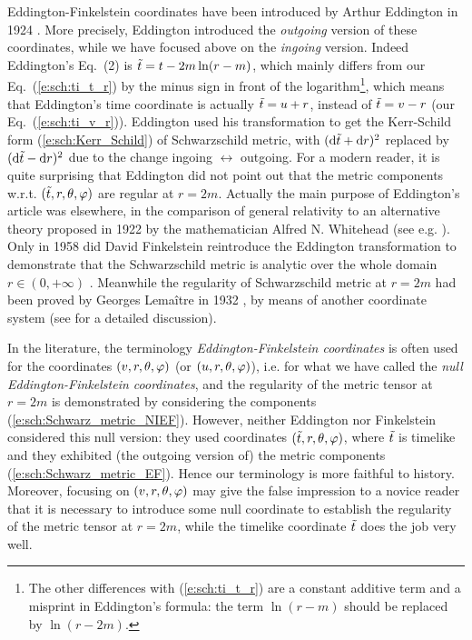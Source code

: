 \begin{hist}
Eddington-Finkelstein coordinates have been introduced by
Arthur Eddington in 1924 \cite{Eddin1924}. More precisely, Eddington
introduced the \emph{outgoing} version of these coordinates,
while we have focused above on the \emph{ingoing} version. Indeed
Eddington's Eq.~(2) is ${\tilde t} = t - 2m \ln(r-m)$, which mainly differs from
our Eq.~(\ref{e:sch:ti_t_r}) by the minus sign in front of the logarithm\footnote{The other differences with (\ref{e:sch:ti_t_r}) are a constant additive term
and a misprint in Eddington's formula: the term $\ln(r-m)$ should be replaced
by $\ln(r-2m)$.},
which means that Eddington's time coordinate is actually ${\tilde t} = u + r$, instead of
${\tilde t} = v - r$ (our Eq.~(\ref{e:sch:ti_v_r})). Eddington used his transformation
to get the Kerr-Schild form (\ref{e:sch:Kerr_Schild}) of Schwarzschild metric,
with $(\mathrm{d} {\tilde t} + \mathrm{d} r)^2$ replaced by $(\mathrm{d} {\tilde t} - \mathrm{d} r)^2$ due to the change
ingoing $\leftrightarrow$ outgoing. For a modern reader, it is quite surprising
that Eddington did not point out that the metric components w.r.t. $({\tilde t},r,\theta,\varphi)$
are regular at $r=2m$. Actually the main purpose of Eddington's article
\cite{Eddin1924} was elsewhere, in the comparison of general relativity to an alternative theory proposed in 1922 by the mathematician Alfred N. Whitehead
(see e.g. \cite{GibboW08}).
Only in 1958 did David Finkelstein reintroduce the Eddington transformation
to demonstrate that the Schwarzschild metric is analytic over the whole domain
$r\in(0,+\infty)$ \cite{Finke58}. Meanwhile the regularity of Schwarzschild metric
at $r=2m$ had been proved by Georges Lemaître in 1932 \cite{Lemai32}, by means of
another coordinate system (see \cite{Eisen93} for a detailed discussion).
\end{hist}

\begin{remark}
In the literature, the terminology \emph{Eddington-Finkelstein coordinates}
is often used for the coordinates $(v,r,\theta,\varphi)$ (or $(u,r,\theta,\varphi)$),
i.e. for what we have called the \emph{null Eddington-Finkelstein coordinates},
and the regularity of the metric tensor at $r=2m$ is demonstrated by
considering the components (\ref{e:sch:Schwarz_metric_NIEF}).
However, neither
Eddington \cite{Eddin1924} nor Finkelstein \cite{Finke58}
considered this null version: they used coordinates $({\tilde t},r,\theta,\varphi)$, where
${\tilde t}$ is timelike and they exhibited (the outgoing version of) the
metric components (\ref{e:sch:Schwarz_metric_EF}).
Hence our terminology is more faithful to history. Moreover, focusing on
$(v,r,\theta,\varphi)$ may give the false impression to a novice reader that it is
necessary to introduce some null coordinate to establish the regularity
of the metric tensor at $r=2m$, while the timelike coordinate ${\tilde t}$
does the job very well.
\end{remark}

